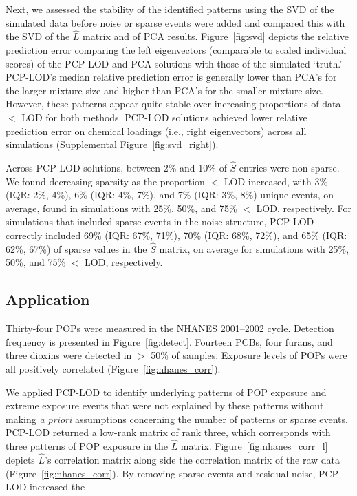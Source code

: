 Next, we assessed the stability of the identified patterns using the SVD of the simulated data before noise or sparse events were added and compared this with the SVD of the $\hat{L}$ matrix and of PCA results. Figure~\ref{fig:svd} depicts the relative prediction error comparing the left eigenvectors (comparable to scaled individual scores) of the PCP-LOD and PCA solutions with those of the simulated `truth.' PCP-LOD's median relative prediction error is generally lower than PCA's for the larger mixture size and higher than PCA's for the smaller mixture size. However, these patterns appear quite stable over increasing proportions of data $<$ LOD for both methods. PCP-LOD solutions achieved lower relative prediction error on chemical loadings (i.e., right eigenvectors) across all simulations (Supplemental Figure~\ref{fig:svd_right}).

Across PCP-LOD solutions, between 2\% and 10\% of $\hat{S}$ entries were non-sparse. We found decreasing sparsity as the proportion $<$ LOD increased, with 3\% (IQR: 2\%, 4\%), 6\% (IQR: 4\%, 7\%), and 7\% (IQR: 3\%, 8\%) unique events, on average, found in simulations with 25\%, 50\%, and 75\% $<$ LOD, respectively. For simulations that included sparse events in the noise structure, PCP-LOD correctly included 69\% (IQR: 67\%, 71\%), 70\% (IQR: 68\%, 72\%), and 65\% (IQR: 62\%, 67\%) of sparse values in the $\hat{S}$ matrix, on average for simulations with 25\%, 50\%, and 75\% $<$ LOD, respectively.

\subsection{Application} Thirty-four POPs were measured in the NHANES 2001--2002 cycle. Detection frequency is presented in Figure~\ref{fig:detect}. Fourteen PCBs, four furans, and three dioxins were detected in $>$ 50\% of samples. Exposure levels of POPs were all positively correlated (Figure~\ref{fig:nhanes_corr}).

{We applied PCP-LOD to identify underlying patterns of POP exposure and extreme exposure events that were not explained by these patterns without making \textit{a priori} assumptions concerning the number of patterns or sparse events. PCP-LOD returned a low-rank matrix of rank three, which corresponds with three patterns of POP exposure in the $\hat{L}$ matrix. Figure~\ref{fig:nhanes_corr_l} depicts $\hat{L}$'s correlation matrix along side the correlation matrix of the raw data (Figure~\ref{fig:nhanes_corr}). By removing sparse events and residual noise, PCP-LOD increased the %
\unskip\parfillskip 0pt \par}

